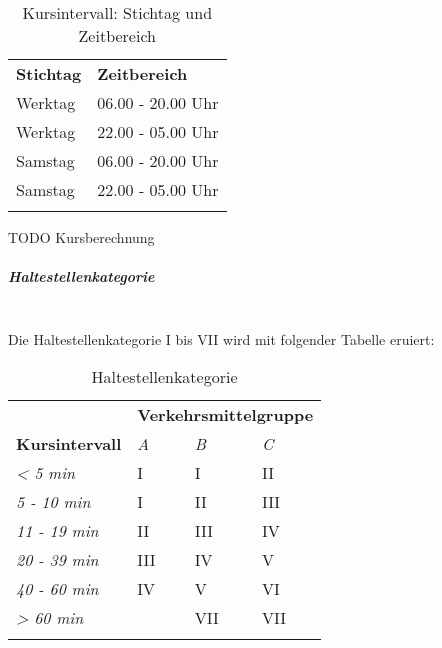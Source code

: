 \begin{longtable}[c]{l l}
    \midrule
    \textbf{Stichtag}
                            & \textbf{Zeitbereich}\\
    Werktag
                            & 06.00 - 20.00 Uhr\\
    Werktag
                            & 22.00 - 05.00 Uhr\\
    Samstag
                            & 06.00 - 20.00 Uhr\\
    Samstag
                            & 22.00 - 05.00 Uhr\\
    \bottomrule
\caption{Kursintervall: Stichtag und Zeitbereich}
\label{table:Ermittlung Kursintervall: Stichtag und Zeitbereich}
\end{longtable}

TODO Kursberechnung

\subparagraph{Haltestellenkategorie}~\\
\label{Berechnungsmethodik OeVGK18:Haltestellenkategorie}
Die Haltestellenkategorie I bis VII wird mit folgender Tabelle eruiert:

\begin{longtable}[c]{l p{4.0cm} p{4.0cm} p{4.0cm}}
    \midrule
    \textbf{}
                            & \multicolumn{3}{l}{\textbf{Verkehrsmittelgruppe}}\\
    \textbf{Kursintervall}
                            & \textit{A}
                            & \textit{B}
                            & \textit{C}\\
    \textit{< 5 min}
                            & I
                            & I
                            & II\\
    \textit{5 - 10 min}
                            & I
                            & II
                            & III\\
    \textit{11 - 19 min}
                            & II
                            & III
                            & IV\\
    \textit{20 - 39 min}
                            & III
                            & IV
                            & V\\
    \textit{40 - 60 min}
                            & IV
                            & V
                            & VI\\
    \textit{> 60 min}
                            &
                            & VII
                            & VII\\
    \bottomrule
\caption{Haltestellenkategorie}
\label{Haltestellenkategorie}
\end{longtable}

